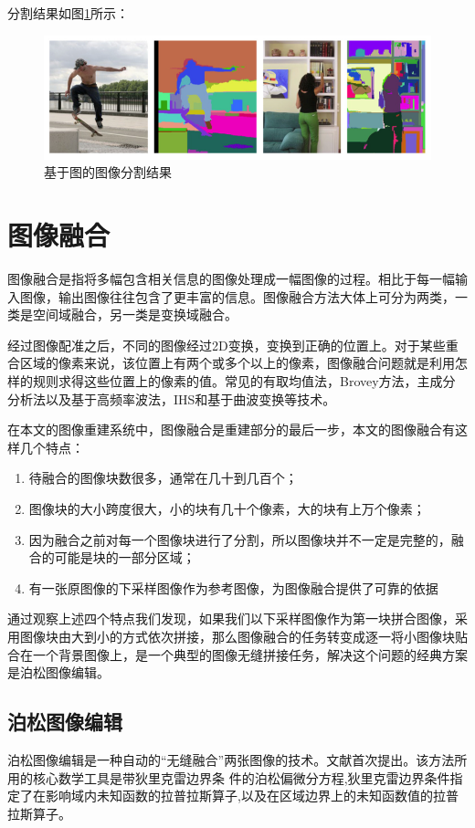 分割结果如图\ref{fig:segment}所示：
\begin{figure}
\centering\includegraphics[width=15cm]{imgs/ch2/segment}
\caption{基于图的图像分割结果}
\label{fig:segment}
\end{figure}

\section{图像融合}

图像融合是指将多幅包含相关信息的图像处理成一幅图像的过程。相比于每一幅输入图像，输出图像往往包含了更丰富的信息。图像融合方法大体上可分为两类，一类是空间域融合，另一类是变换域融合。

经过图像配准之后，不同的图像经过2D变换，变换到正确的位置上。对于某些重合区域的像素来说，该位置上有两个或多个以上的像素，图像融合问题就是利用怎样的规则求得这些位置上的像素的值。常见的有取均值法，Brovey方法，主成分分析法以及基于高频率波法，IHS和基于曲波变换等技术。

在本文的图像重建系统中，图像融合是重建部分的最后一步，本文的图像融合有这样几个特点：

\begin{enumerate}
\item 待融合的图像块数很多，通常在几十到几百个；
\item 图像块的大小跨度很大，小的块有几十个像素，大的块有上万个像素；
\item 因为融合之前对每一个图像块进行了分割，所以图像块并不一定是完整的，融合的可能是块的一部分区域；
\item 有一张原图像的下采样图像作为参考图像，为图像融合提供了可靠的依据
\end{enumerate}

通过观察上述四个特点我们发现，如果我们以下采样图像作为第一块拼合图像，采用图像块由大到小的方式依次拼接，那么图像融合的任务转变成逐一将小图像块贴合在一个背景图像上，是一个典型的图像无缝拼接任务，解决这个问题的经典方案是泊松图像编辑。

\subsection{泊松图像编辑}
泊松图像编辑是一种自动的“无缝融合”两张图像的技术。文献\cite{Perez:2003ul}首次提出。该方法所用的核心数学工具是带狄里克雷边界条 件的泊松偏微分方程,狄里克雷边界条件指定了在影响域内未知函数的拉普拉斯算子,以及在区域边界上的未知函数值的拉普拉斯算子\cite{张建桥:2010vm}。

